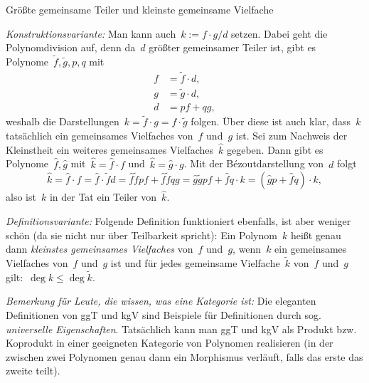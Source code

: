 \documentclass{algblatt}
\begin{document}
\begin{aufgabe}{Größte gemeinsame Teiler und kleinste gemeinsame Vielfache}
\begin{loesungE}
\emph{Konstruktionsvariante:} Man kann auch~$k := f \cdot g / d$ setzen. Dabei geht
die Polynomdivision auf, denn da~$d$ größter gemeinsamer Teiler ist, gibt es
Polynome~$\widetilde f, \widetilde g, p, q$ mit
\begin{align*}
  f &= \widetilde f \cdot d, \\
  g &= \widetilde g \cdot d, \\
  d &= p f + q g,
\end{align*}
weshalb die Darstellungen~$k = \widetilde f \cdot g = f \cdot \widetilde g$
folgen. Über diese ist auch klar, dass~$k$ tatsächlich ein gemeinsames
Vielfaches von~$f$ und~$g$ ist. Sei zum Nachweis der Kleinstheit ein weiteres
gemeinsames Vielfaches~$\widehat k$ gegeben. Dann gibt es Polynome~$\widehat f,
\widehat g$ mit~$\widehat k = \widehat f \cdot f$ und~$\widehat k = \widehat g
\cdot g$. Mit der Bézoutdarstellung von~$d$ folgt
\[ \widehat k = \widehat f \cdot f =
  \widehat f \cdot \widetilde f d =
  \widehat f \widetilde f p f + \widehat f \widetilde f q g =
  \widehat g \widetilde g p f + \widehat f q \cdot k =
  (\widehat g p + \widehat f q) \cdot k, \]
also ist~$k$ in der Tat ein Teiler von~$\widehat k$.

\emph{Definitionsvariante:} Folgende Definition funktioniert ebenfalls, ist aber weniger
schön (da sie nicht nur über Teilbarkeit spricht): Ein Polynom~$k$ heißt genau
dann \emph{kleinstes gemeinsames Vielfaches} von~$f$ und~$g$, wenn~$k$ ein
gemeinsames Vielfaches von~$f$ und~$g$ ist und für jedes gemeinsame
Vielfache~$\widetilde k$ von~$f$ und~$g$ gilt:~$\deg k \leq \deg \widetilde k$.

\emph{Bemerkung für Leute, die wissen, was eine Kategorie ist:} Die eleganten
Definitionen von ggT und kgV sind Beispiele für Definitionen durch sog.
\emph{universelle Eigenschaften}. Tatsächlich kann man ggT und kgV als Produkt
bzw. Koprodukt in einer geeigneten Kategorie von Polynomen realisieren (in der
zwischen zwei Polynomen genau dann ein Morphismus verläuft, falls das erste das
zweite teilt).
\end{loesungE}
\end{aufgabe}
\end{document}
